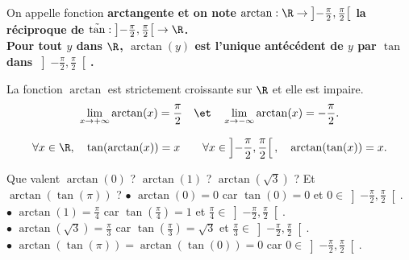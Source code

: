 \documentclass[11pt]{article}
\begin{document}
\begin{defi}{}{}
    On appelle fonction \bf{arctangente} et on note $\arctan:\R\to\left]-\frac{\pi}{2},\frac{\pi}{2}\right[$ la réciproque de $\tilde{\tan}:\left]-\frac{\pi}{2},\frac{\pi}{2}\right[\to\R$.\\
    Pour tout $y$ dans $\R$, $\arctan(y)$ est l'unique antécédent de $y$ par $\tan$ dans $\left]-\frac{\pi}{2},\frac{\pi}{2}\right[$.
\end{defi}

\begin{prop}{}{}
    La fonction $\arctan$ est strictement croissante sur $\R$ et elle est impaire.
    \begin{equation*}
        \lim_{x\to+\infty}\arctan(x)=\frac{\pi}{2}\quad\et\quad\lim_{x\to-\infty}\arctan(x)=-\frac{\pi}{2}.
    \end{equation*}
\end{prop}

\begin{prop}{}{}
    \begin{equation*}
        \forall x \in \R,\quad\tan(\arctan(x))=x\qquad\forall x \in \left]-\frac{\pi}{2},\frac{\pi}{2}\right[,\quad\arctan(\tan(x))=x.
    \end{equation*}
\end{prop}

\begin{ex}{}{}
    Que valent $\arctan(0)$ ? $\arctan(1)$ ? $\arctan(\sqrt{3})$ ? Et $\arctan(\tan(\pi))$ ?
    \tcblower
    $\bullet$ $\arctan(0)=0$ car $\tan(0)=0$ et $0\in\left]-\frac{\pi}{2},\frac{\pi}{2}\right[$.\\
    $\bullet$ $\arctan(1)=\frac{\pi}{4}$ car $\tan(\frac{\pi}{4})=1$ et $\frac{\pi}{4}\in\left]-\frac{\pi}{2},\frac{\pi}{2}\right[$.\\
    $\bullet$ $\arctan(\sqrt{3})=\frac{\pi}{3}$ car $\tan(\frac{\pi}{3})=\sqrt{3}$ et $\frac{\pi}{3}\in\left]-\frac{\pi}{2},\frac{\pi}{2}\right[$.\\
    $\bullet$ $\arctan(\tan(\pi))=\arctan(\tan(0))=0$ car $0\in\left]-\frac{\pi}{2},\frac{\pi}{2}\right[$.
\end{ex}
\end{document}
